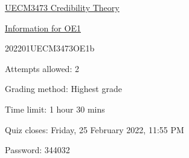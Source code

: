 \documentclass[11pt,a4paper]{article}
\begin{document}
\LARGE
\centerline{\underline{\sc\LARGE UECM3473 Credibility Theory}}
\vspace{1em}
\centerline{\underline{\sc\LARGE Information for OE1}}

\begin{center}
  202201UECM3473OE1b

Attempts allowed: 2

Grading method: Highest grade

Time limit: 1 hour 30 mins

Quiz closes: Friday, 25 February 2022, 11:55 PM

Password: 344032
\end{center}
\end{document}
